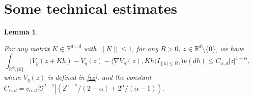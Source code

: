 \documentclass[11pt,reqno]{amsart}
\newtheorem{lemma}{\indent Lemma}[section]
\numberwithin{equation}{section}
\begin{document}












\appendix



\section{Some technical estimates}\label{tech}

\begin{lemma}\label{v-A}
	
	For any matrix
	$K\in\mathbb R^{d\times d}$ with $\|K\|\leq1$, for any $R>0$, $ z\in \mathbb R^{d}\setminus\{0\}$,
	we have
	\begin{equation}\label{z1-2-A}
		\int_{\mathbb R^{d}\setminus\{0\}}\Big(V_\eta(z+Kh)-V_\eta(z)-\langle\nabla V_\eta(z),Kh\rangle
		I_{\{|h|\leq R\}}\Big)\nu(dh)\leq C_{\alpha,d}|z|^{1-\alpha},
	\end{equation}
	where $V_\eta(z)$ is defined in \eqref{vz}, and the constant $C_{\alpha,d}=
	c_{\alpha,d}|\mathbb S^{d-1}|
	\left(	2^{\alpha-2}/(2-\alpha)+2^{\alpha}/(\alpha-1)
	\right)$.%
\end{lemma}
\end{document}
